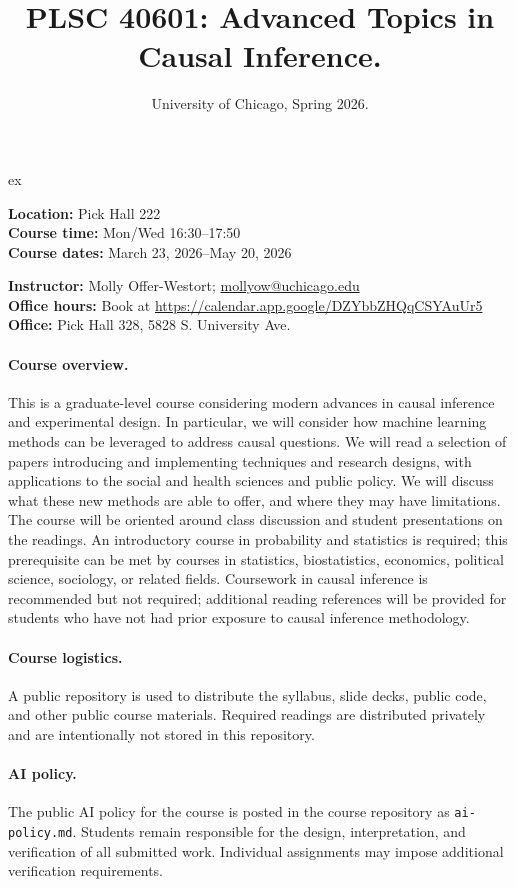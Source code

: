 \documentclass[letterpaper, 12pt, parskip=full,DIV=10]{scrartcl}
\title{PLSC 40601: Advanced Topics in Causal Inference.}
\subtitle{University of Chicago, Spring 2026.}
\begin{document}
\maketitle

 ex

\textbf{Location:} Pick Hall 222\\
\textbf{Course time:} Mon/Wed 16:30--17:50\\
\textbf{Course dates:} March 23, 2026--May 20, 2026

\textbf{Instructor:} Molly Offer-Westort; \href{mailto:mollyow@uchicago.edu}{mollyow@uchicago.edu}\\
\textbf{Office hours:} Book at \url{https://calendar.app.google/DZYbbZHQqCSYAuUr5}\\
\textbf{Office:} Pick Hall 328, 5828 S. University Ave.

\paragraph{Course overview.}
This is a graduate-level course considering modern advances in causal inference and experimental design. 
In particular, we will consider how machine learning methods can be leveraged to address causal questions. 
We will read a selection of papers introducing and implementing techniques and research designs, with applications to the social and health sciences and public policy. 
We will discuss what these new methods are able to offer, and where they may have limitations. 
The course will be oriented around class discussion and student presentations on the readings. 
An introductory course in probability and statistics is required; this prerequisite can be met by courses in statistics, biostatistics, economics, political science, sociology, or related fields. 
Coursework in causal inference is recommended but not required; additional reading references will be provided for students who have not had prior exposure to causal inference methodology. 

\paragraph{Course logistics.}
A public repository is used to distribute the syllabus, slide decks, public code, and other public course materials. 
Required readings are distributed privately and are intentionally not stored in this repository.

\paragraph{AI policy.}
The public AI policy for the course is posted in the course repository as \texttt{ai-policy.md}.
Students remain responsible for the design, interpretation, and verification of all submitted work. 
Individual assignments may impose additional verification requirements. 
\end{document}
